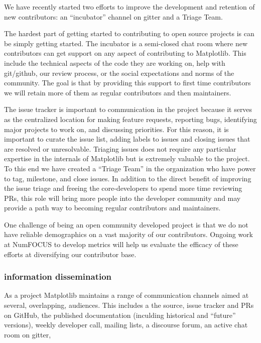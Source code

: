 \documentclass[12pt]{article}
\numberwithin{page}{section}
\begin{document}
We have recently started two efforts to improve the development and
retention of new contributors: an ``incubator'' channel on gitter and
a Triage Team.

The hardest part of getting started to contributing to open source
projects is can be simply getting started.  The incubator is a
semi-closed chat room where new contributors can get support on any
aspect of contributing to Matplotlib.  This include the technical
aspects of the code they are working on, help with git/github, our
review process, or the social expectations and norms of the community.  The
goal is that by providing this support to first time contributors we will
retain more of them as regular contributors and then maintainers.

The issue tracker is important to communication in the project because
it serves as the centralized location for making feature requests,
reporting bugs, identifying major projects to work on, and discussing
priorities.  For this reason, it is important to curate the issue
list, adding labels to issues and closing issues that are resolved or
unresolvable. Triaging issues does not require any particular
expertise in the internals of Matplotlib but is extremely valuable to
the project.  To this end we have created a ``Triage Team'' in the
organization who have power to tag, milestone, and close issues.  In
addition to the direct benefit of improving the issue triage and
freeing the core-developers to spend more time reviewing PRs, this
role will bring more people into the developer community and may
provide a path way to becoming regular contributors and maintainers.

One challenge of being an open community developed project is that we
do not have reliable demographics on a vast majority of our
contributors.  Ongoing work at NumFOCUS to develop metrics will help
us evaluate the efficacy of these efforts at diversifying our
contributor base.

\subsubsection{information dissemination}

As a project Matplotlib maintains a range of communication channels
aimed at several, overlapping, audiences.  This includes a
the source, issue tracker and PRs on GitHub,
the published documentation (inculding historical and ``future'' versions),
weekly developer call,
mailing lists,
a discourse forum,
an active chat room on gitter,
\end{document}
